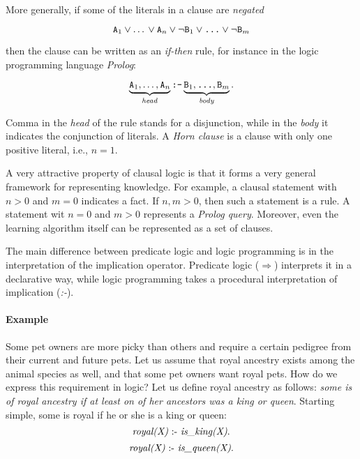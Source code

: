 More generally, if some of the literals in a clause are \textit{negated}

$$ \text{\texttt{A}}_1 \vee \text{\ldots} \vee \text{\texttt{A}}_n \vee \neg \text{\texttt{B}}_1 \vee \text{\texttt{\ldots}} \vee \neg \text{\texttt{B}}_m$$

then the clause can be written as an \textit{if-then} rule, for instance in the logic programming language \textit{Prolog}:

$$ \underbrace{\text{\texttt{A}}_1, \text{\ldots}, \text{\texttt{A}}_n}_{\text{\textit{head}}} \text{\texttt{:-}} \underbrace{\text{\texttt{B}}_1, \text{\texttt{\ldots}}, \text{\texttt{B}}_m}_{\text{\textit{body}}}.$$

Comma in the \textit{head} of the rule stands for a disjunction, while in the \textit{body} it indicates the conjunction of literals.
A \textit{Horn clause} is a clause with only one positive literal, i.e., $n = 1$.



A very attractive property of clausal logic is that it forms a very general framework for representing knowledge.
For example, a clausal statement with $n > 0$ and $m = 0$ indicates a fact.
If $n, m > 0$, then such a statement is a rule.
A statement wit $n=0$ and $m > 0$ represents a \textit{Prolog query}.
Moreover, even the learning algorithm itself can be represented as a set of clauses.



The main difference between predicate logic and logic programming is in the interpretation of the implication operator.
Predicate logic ($\Rightarrow$) interprets it in a declarative way, while logic programming takes a procedural interpretation of implication (\textit{:-}). 



\paragraph{Example}
Some pet owners are more picky than others and require a certain pedigree from their current and future pets.
Let us assume that royal ancestry exists among the animal species as well, and that some pet owners want royal pets.
How do we express this requirement in logic?
Let us define royal ancestry as follows: \textit{some is of royal ancestry if at least on of her ancestors was a king or queen}.
Starting simple, some is royal if he or she is a king or queen:
$$ \text{\textit{royal(X)}} \text{ :- } \text{\textit{is\_king(X)}}.$$
$$ \text{\textit{royal(X)}} \text{ :- } \text{\textit{is\_queen(X)}}.$$

